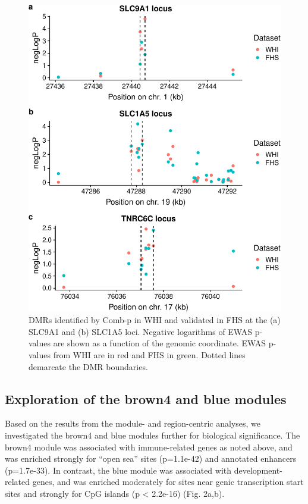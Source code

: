 \documentclass[]{article}
\theoremstyle{definition}
\theoremstyle{definition}
\theoremstyle{definition}
\theoremstyle{remark}
\begin{document}
\begin{figure}[htbp]
\centering
\includegraphics{../doc/module_ewas/figures/combp-plots-1.pdf}
\caption{\label{fig:combp-plots}DMRs identified by Comb-p in WHI and
validated in FHS at the (a) SLC9A1 and (b) SLC1A5 loci. Negative
logarithms of EWAS p-values are shown as a function of the genomic
coordinate. EWAS p-values from WHI are in red and FHS in green. Dotted
lines demarcate the DMR boundaries.}
\end{figure}

\subsection{Exploration of the brown4 and blue
modules}\label{exploration-of-the-brown4-and-blue-modules}

Based on the results from the module- and region-centric analyses, we
investigated the brown4 and blue modules further for biological
significance. The brown4 module was associated with immune-related genes
as noted above, and was enriched strongly for ``open sea'' sites
(p=1.1e-42) and annotated enhancers (p=1.7e-33). In contrast, the blue
module was associated with development-related genes, and was enriched
moderately for sites near genic transcription start sites and strongly
for CpG islands (p \textless{} 2.2e-16) (Fig. 2a,b).
\end{document}

